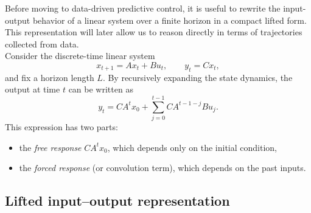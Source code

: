 Before moving to data-driven predictive control, it is useful to rewrite the input-output behavior of a linear system over a finite horizon in a compact lifted form. This representation will later allow us to reason directly in terms of trajectories collected from data.\\
Consider the discrete-time linear system
$$
x_{t+1} = A x_t + B u_t, 
\qquad
y_t = C x_t,
$$
and fix a horizon length $L$. By recursively expanding the state dynamics, the output at time $t$ can be written as
$$
y_t = C A^t x_0 + \sum_{j=0}^{t-1} C A^{t-1-j} B u_j .
$$
This expression has two parts:
\begin{itemize}
    \item the \emph{free response} $C A^t x_0$, which depends only on the initial condition,
    \item the \emph{forced response} (or convolution term), which depends on the past inputs.
\end{itemize}

\subsection{Lifted input--output representation}


